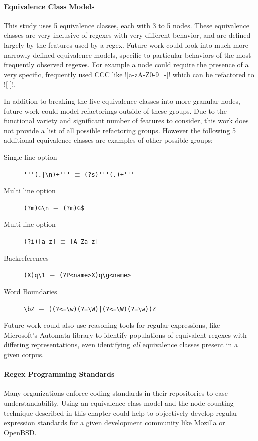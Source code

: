 
\paragraph{Equivalence Class Models}
This study uses 5 equivalence classes, each with 3 to 5 nodes.  These equivalence classes are very inclusive of regexes with very different behavior, and are defined largely by the features used by a regex.  Future work could look into much more narrowly defined equivalence models, specific to particular behaviors of the most frequently observed regexes.  For example a node could require the presence of a very specific, frequently used CCC like \cverb![a-zA-Z0-9_-]! which can be refactored to \cverb![\w-]!.

In addition to breaking the five equivalence classes into more granular nodes, future work could model refactorings outside of these groups. Due to the functional variety and significant number of features to consider, this work does not provide a list of all possible refactoring groups.  However the following 5 additional equivalence classes are examples of other possible groups:
\begin{description}
\item[Single line option]  \verb!'''(.|\n)+'''! $\equiv$ \verb!(?s)'''(.)+'''!
\item[Multi line option]  \verb!(?m)G\n! $\equiv$ \verb!(?m)G$!
\item[Multi line option]  \verb!(?i)[a-z]! $\equiv$ \verb![A-Za-z]!
\item[Backreferences]  \verb!(X)q\1! $\equiv$ \verb!(?P<name>X)q\g<name>!
\item[Word Boundaries]  \verb!\bZ! $\equiv$ \verb!((?<=\w)(?=\W)|(?<=\W)(?=\w))Z!
\end{description}

Future work could also use reasoning tools for regular expressions, like Microsoft's Automata library to identify populations of equivalent regexes with differing representations, even identifying \emph{all} equivalence classes present in a given corpus.

\paragraph{Regex Programming Standards}
Many organizations enforce coding standards in their repositories to ease understandability.  Using an equivalence class model and the node counting technique described in this chapter could help to objectively develop regular expression standards for a given development community like Mozilla or OpenBSD.

